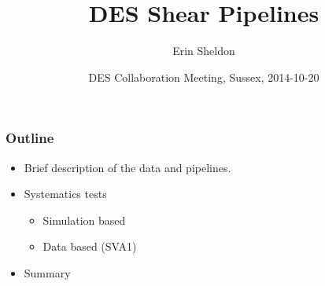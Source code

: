 \documentclass{beamer}
\begin{document}


\title{DES Shear Pipelines}
\author{Erin Sheldon}
\date{DES Collaboration Meeting, Sussex, 2014-10-20}

\frame{\titlepage}

\frame
{
    \frametitle{Outline}

    \begin{itemize}

        \item Brief description of the data and pipelines.
        \item Systematics tests
            \begin{itemize}
                \item Simulation based
                \item Data based (SVA1)
            \end{itemize}
        \item Summary
    \end{itemize}
}
 
\end{document}
